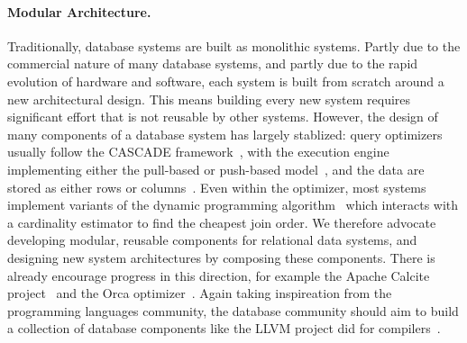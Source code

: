 \paragraph*{Modular Architecture.}
Traditionally, database systems are built as monolithic systems.
Partly due to the commercial nature of many database systems, 
 and partly due to the rapid evolution of hardware and software,
 each system is built from scratch 
 around a new architectural design.
This means building every new system requires significant effort
 that is not reusable by other systems.
However, the design of many components of a database system 
 has largely stablized:
 query optimizers usually follow the \textsf{CASCADE} framework~\cite{Graefe95a},
 with the execution engine implementing either the pull-based or push-based model~\cite{DBLP:journals/pvldb/KerstenLKNPB18},
 and the data are stored as either rows or columns~\cite{DBLP:journals/ftdb/AbadiBHIM13}.
Even within the optimizer, most systems implement variants of the dynamic programming algorithm~\cite{DBLP:conf/vldb/MoerkotteN06}
 which interacts with a cardinality estimator to find the cheapest join order.
We therefore advocate developing modular, reusable components 
 for relational data systems, 
 and designing new system architectures by composing these components.
There is already encourage progress in this direction, 
 for example the Apache Calcite project~\cite{begoli2018apache} and 
 the Orca optimizer~\cite{DBLP:conf/sigmod/SolimanAREGSCGRPWNKB14}.
Again taking inspireation from the programming languages community, 
 the database community should aim to build a collection of 
 database components like the LLVM project did for compilers~\cite{DBLP:conf/cgo/LattnerA04}.